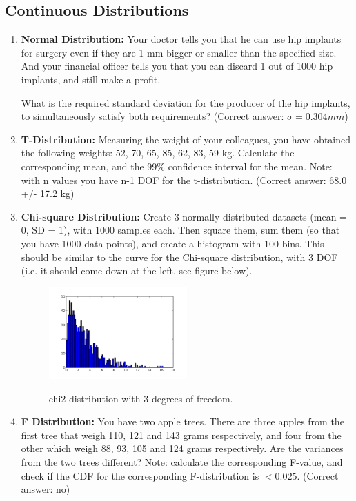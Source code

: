 \subsection{Continuous Distributions }
\begin{enumerate}
    \item \textbf{Normal Distribution:} Your doctor tells you that he can use hip implants for surgery even if they are 1 mm bigger or smaller than the specified size. And your financial officer tells you that you can discard 1 out of 1000 hip implants, and still make a profit.

        What is the required standard deviation for the producer of the hip implants, to simultaneously satisfy both requirements?
        (Correct answer: $\sigma=0.304 mm$)
    \item \textbf{T-Distribution:} Measuring the weight of your colleagues, you have obtained the following weights: 52, 70, 65, 85, 62, 83, 59 kg.
    Calculate the corresponding mean, and the 99\% confidence interval for the mean. Note: with n values you have n-1 DOF for the t-distribution.
    (Correct answer: 68.0 +/- 17.2 kg)

    \item \textbf{Chi-square Distribution:} Create 3 normally distributed datasets (mean = 0, SD = 1), with 1000 samples each. Then square them, sum them (so that you have 1000 data-points), and create a histogram with 100 bins. This should be similar to the curve for the Chi-square distribution, with 3 DOF (i.e. it should come down at the left, see figure below).
    \begin{figure}
      \centering
      \includegraphics[width=0.5\textwidth]{../Images/chi2_3dof.png}\\
      \caption{chi2 distribution with 3 degrees of freedom.}\label{fig:chi23dof}
    \end{figure}

    \item \textbf{F Distribution:} You have two apple trees. There are three apples from the first tree that weigh 110, 121 and 143 grams respectively, and four from the other which weigh 88, 93, 105 and 124 grams respectively. Are the variances from the two trees different?
    Note: calculate the corresponding F-value, and check if the CDF for the corresponding F-distribution is $<0.025$.
    (Correct answer: no)
\end{enumerate}
